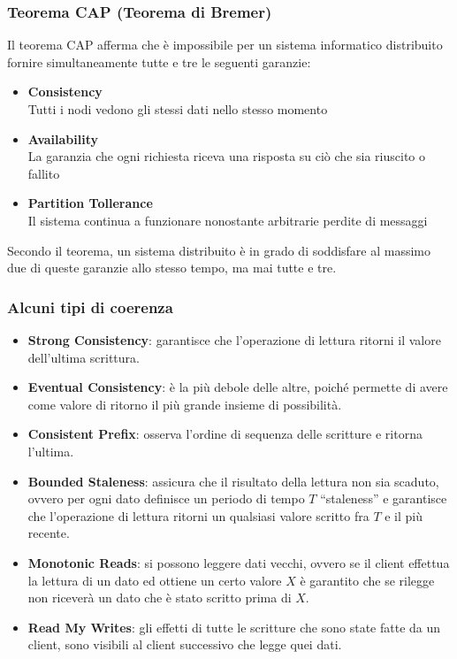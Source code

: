\begin{frame}
\frametitle{Teorema CAP (Teorema di Bremer)}
	\begin{definizione}
	 Il \alert{teorema CAP} afferma che è impossibile per un sistema informatico distribuito fornire simultaneamente tutte e tre le seguenti garanzie:
	\begin{itemize}
		\item \textbf{Consistency}\\
		Tutti i nodi vedono gli stessi dati nello stesso momento
		\item \textbf{Availability}\\
	    La garanzia che ogni richiesta riceva una risposta su ciò che sia riuscito o fallito
		\item \textbf{Partition Tollerance}\\
		Il sistema continua a funzionare nonostante arbitrarie perdite di messaggi
	\end{itemize}
	Secondo il teorema, un sistema distribuito è in grado di soddisfare al massimo due di queste garanzie allo stesso tempo, ma mai tutte e tre.
	\end{definizione}
\end{frame}

\begin{frame}
\frametitle{Alcuni tipi di coerenza}
\begin{itemize}
  \item \textbf{Strong Consistency}: garantisce che l'operazione di lettura ritorni il valore dell'ultima scrittura.
  \item \textbf{Eventual Consistency}: è la più debole delle altre, poiché permette di avere come valore di ritorno il più grande insieme di possibilità.
  \item \textbf{Consistent Prefix}: osserva l'ordine di sequenza delle scritture e ritorna l'ultima.
  \item \textbf{Bounded Staleness}: assicura che il risultato della lettura non sia scaduto, ovvero per ogni dato definisce un periodo di tempo $T$ ``staleness'' e garantisce che l'operazione di lettura ritorni un qualsiasi valore scritto fra $T$ e il più recente.
  \item \textbf{Monotonic Reads}: si possono leggere dati vecchi, ovvero se il client effettua la lettura di un dato ed ottiene un certo valore $X$ è garantito che se rilegge non riceverà un dato che è stato scritto prima di $X$. 
  \item \textbf{Read My Writes}: gli effetti di tutte le scritture che sono state fatte da un client, sono visibili al client successivo che legge quei dati.
\end{itemize}
\end{frame}

